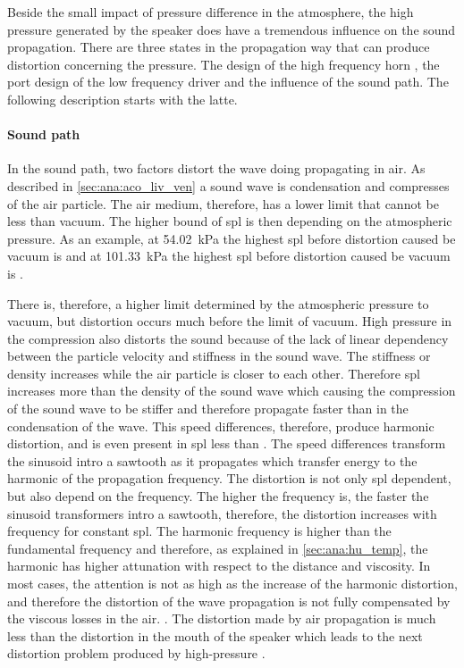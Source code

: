 Beside the small impact of pressure difference in the atmosphere, the high pressure generated by the speaker does have a tremendous influence on the sound propagation. There are three states in the propagation way that can produce distortion concerning the pressure. The design of the high frequency horn \citep{czerwinski1999air}, the port design of the low frequency driver \citep{vanderkooy1998nonlinearities} and the influence of the sound path. The following description starts with the latte.


\paragraph{Sound path} In the sound path, two factors distort the wave doing propagating in air. As described in \autoref{sec:ana:aco_liv_ven} a sound wave is condensation and compresses of the air particle. The air medium, therefore, has a lower limit that cannot be less than vacuum. The higher bound of \gls{spl} is then depending on the atmospheric pressure. As an example, at \SI{54.02}{\kilo\pascal} the highest \gls{spl} before distortion caused be vacuum is  and at \SI{101.33}{\kilo\pascal} the highest \gls{spl} before distortion caused be vacuum is . 

There is, therefore, a higher limit determined by the atmospheric pressure to vacuum,  but distortion occurs much before the limit of vacuum.  High pressure in the compression also distorts the sound because of the lack of linear dependency between the particle velocity and stiffness in the sound wave. The stiffness or density increases while the air particle is closer to each other. Therefore \gls{spl} increases more than the density of the sound wave which causing the compression of the sound wave to be stiffer and therefore propagate faster than in the condensation of the wave. This speed differences, therefore, produce harmonic distortion, and is even present in \gls{spl} less than  \citep{czerwinski1999air}. The speed differences transform the sinusoid intro a sawtooth as it propagates which transfer energy to the harmonic of the propagation frequency. The distortion is not only \gls{spl} dependent, but also depend on the frequency. The higher the frequency is, the faster the sinusoid transformers intro a sawtooth, therefore, the distortion increases with frequency for constant \gls{spl}. The harmonic frequency is higher than the fundamental frequency and therefore, as explained in \autoref{sec:ana:hu_temp}, the harmonic has higher attunation with respect to the distance and viscosity. In most cases, the attention is not as high as the increase of the harmonic distortion, and therefore the distortion of the wave propagation is not fully compensated by the viscous losses in the air. \citep{czerwinski1999air}. 
The distortion made by air propagation is much less than the distortion in the mouth of the speaker which leads to the next distortion problem produced by high-pressure \citep{czerwinski1999air}.

